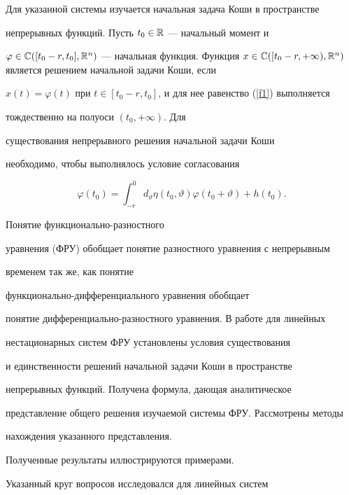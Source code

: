 Для указанной системы изучается начальная задача Коши в пространстве 


непрерывных функций. Пусть $t_{0}\in\Bbb{R}$ --- начальный момент и 


$\varphi\in\Bbb{C} ([t_{0}-r,t_{0}],\Bbb{R}


^{n})$ --- начальная функция. Функция $x\in\Bbb{C} ([t_{0}-r,+\infty)


,\Bbb{R}^{n})$ является решением начальной задачи Коши, если


$x (t)=\varphi (t) $ при $t\in [t_{0}


-r,t_{0}]$, и для нее равенство (\ref{f1}) выполняется


тождественно на полуоси $ (t_{0},+\infty) $. Для


существования непрерывного решения начальной задачи Коши


необходимо, чтобы выполнялось условие согласования


\begin{equation}


\varphi (t_{0})=\int_{-r}^{0}d_{\vartheta}\eta (


t_{0},\vartheta) \varphi (t_{0}+\vartheta) +h (


t_{0}) .\label{sogl_obch}


\end{equation}





Понятие функционально-разностного 


уравнения (ФРУ) обобщает понятие разностного уравнения с непрерывным 


временем так же, как понятие 


функционально-дифференциального уравнения обобщает 


понятие дифференциально-разностного уравнения. В работе для линейных 


нестационарных систем ФРУ установлены условия существования 


и единственности решений начальной задачи Коши в пространстве 


непрерывных функций. Получена формула, дающая аналитическое 


представление общего решения изучаемой системы ФРУ. Рассмотрены методы


нахождения указанного представления. 


Полученные результаты иллюстрируются примерами. 


Указанный круг вопросов исследовался для линейных систем 



